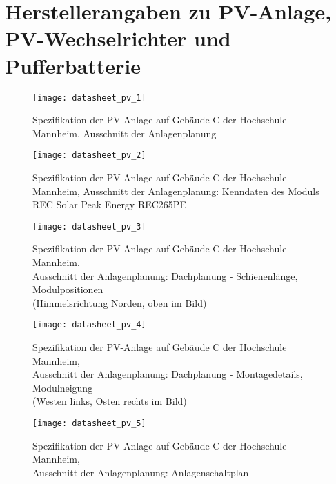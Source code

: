 \section{Herstellerangaben zu PV-Anlage, PV-Wechselrichter und Pufferbatterie}
\label{Kap:datasheet_pv_wr}

  \begin{figure}[h] 
      \centering
      \texttt{[image: datasheet\_pv\_1]}
      \caption{Spezifikation der PV-Anlage auf Gebäude C der Hochschule Mannheim, Ausschnitt der Anlagenplanung} 
      \label{Abb:datasheet_pv_1}
  \end{figure} 	

  \begin{figure}[h] 
      \centering
      \texttt{[image: datasheet\_pv\_2]}
      \caption{Spezifikation der PV-Anlage auf Gebäude C der Hochschule Mannheim, Ausschnitt der Anlagenplanung: Kenndaten des Moduls REC Solar Peak Energy REC265PE} 
      \label{Abb:datasheet_pv_2}
  \end{figure} 	

  \begin{figure}[h] 
      \centering
      \texttt{[image: datasheet\_pv\_3]}
      \caption{Spezifikation der PV-Anlage auf Gebäude C der Hochschule Mannheim, \\ Ausschnitt der Anlagenplanung: Dachplanung - Schienenlänge, Modulpositionen \\ (Himmelsrichtung Norden, oben im Bild)} 
      \label{Abb:datasheet_pv_3}
  \end{figure} 	

  \begin{figure}[h] 
      \centering
      \texttt{[image: datasheet\_pv\_4]}
      \caption{Spezifikation der PV-Anlage auf Gebäude C der Hochschule Mannheim, \\ Ausschnitt der Anlagenplanung: Dachplanung - Montagedetails, Modulneigung \\ (Westen links, Osten rechts im Bild)} 
      \label{Abb:datasheet_pv_4}
  \end{figure} 	

  \begin{figure}[h] 
      \centering
      \texttt{[image: datasheet\_pv\_5]}
      \caption{Spezifikation der PV-Anlage auf Gebäude C der Hochschule Mannheim, \\ Ausschnitt der Anlagenplanung: Anlagenschaltplan} 
      \label{Abb:datasheet_pv_5}
  \end{figure} 	

